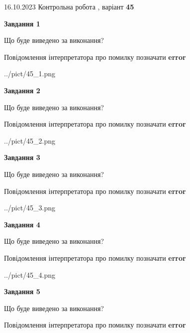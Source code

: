 \documentclass[12pt, ukrainian]{article}
\begin{document}
{\Large{16.10.2023 Контрольна робота , варіант  \No \textbf { 45 }\par}}
{
\begin {large}
{\begin {center}\textbf{Завдання 1}\end {center}}\par
Що буде виведено за виконання? \par
Повідомлення інтерпретатора про помилку позначати \textbf{error}

\begin{center}
	{../pict/45_1.png}
\end{center}
\newpage

{\begin {center}\textbf{Завдання 2}\end {center}}\par
Що буде виведено за виконання? \par
Повідомлення інтерпретатора про помилку позначати \textbf{error}

\begin{center}
	{../pict/45_2.png}
\end{center}
\newpage

{\begin {center}\textbf{Завдання 3}\end {center}}\par
Що буде виведено за виконання? \par
Повідомлення інтерпретатора про помилку позначати \textbf{error}

\begin{center}
	{../pict/45_3.png}
\end{center}
\newpage

{\begin {center}\textbf{Завдання 4}\end {center}}\par
Що буде виведено за виконання? \par
Повідомлення інтерпретатора про помилку позначати \textbf{error}

\begin{center}
	{../pict/45_4.png}
\end{center}
\newpage

{\begin {center}\textbf{Завдання 5}\end {center}}\par
Що буде виведено за виконання? \par
Повідомлення інтерпретатора про помилку позначати \textbf{error}


\end{large}}
\end{document}
